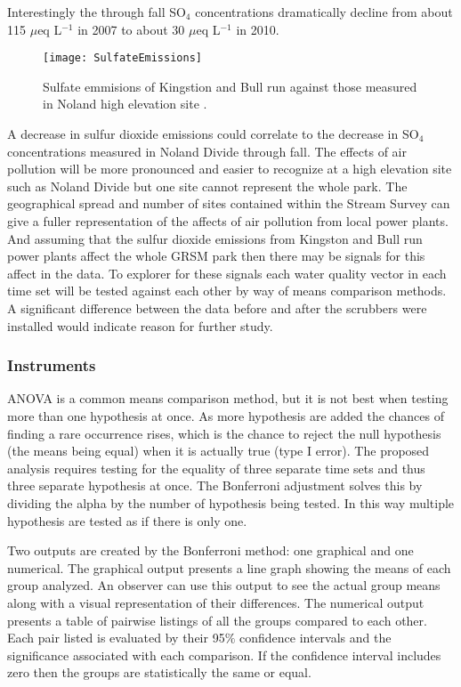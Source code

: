 Interestingly the through fall SO$_4$ concentrations dramatically decline from about 115 $\mu$eq L$^{-1}$ in 2007 to about 30 $\mu$eq L$^{-1}$ in 2010.
\begin{figure}[h!]
  \centering
  \texttt{[image: SulfateEmissions]}\\
  \caption{Sulfate emmisions of Kingstion and Bull run against those measured in Noland high elevation site \citep{annualreport2012}.}\label{fig:sulfateemissions}
\end{figure}
A decrease in sulfur dioxide emissions could correlate to the decrease in SO$_4$ concentrations measured in Noland Divide through fall.
The effects of air pollution will be more pronounced and easier to recognize at a high elevation site such as Noland Divide but one site cannot represent the whole park.
The geographical spread and number of sites contained within the Stream Survey can give a fuller representation of the affects of air pollution from local power plants.
And assuming that the sulfur dioxide emissions from Kingston and Bull run power plants affect the whole GRSM park then there may be signals for this affect in the data.
To explorer for these signals each water quality vector in each time set will be tested against each other by way of means comparison methods.
A significant difference between the data before and after the scrubbers were installed would indicate reason for further study.

\subsubsection{Instruments}
ANOVA is a common means comparison method, but it is not best when testing more than one hypothesis at once.
As more hypothesis are added the chances of finding a rare occurrence rises, which is the chance to reject the null hypothesis (the means being equal) when it is actually true (type I error).
The proposed analysis requires testing for the equality of three separate time sets and thus three separate hypothesis at once.
The Bonferroni adjustment solves this by dividing the alpha by the number of hypothesis being tested.
In this way multiple hypothesis are tested as if there is only one.

Two outputs are created by the Bonferroni method: one graphical and one numerical.
The graphical output presents a line graph showing the means of each group analyzed.
An observer can use this output to see the actual group means along with a visual representation of their differences.
The numerical output presents a table of pairwise listings of all the groups compared to each other.
Each pair listed is evaluated by their 95$\%$ confidence intervals and the significance associated with each comparison.
If the confidence interval includes zero then the groups are statistically the same or equal.

